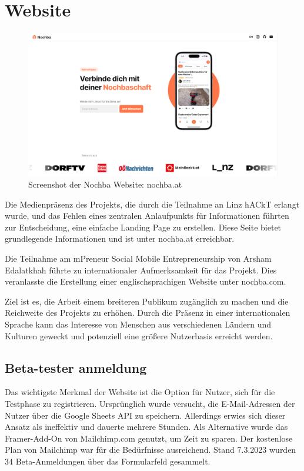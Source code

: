 \section{Website}
\begin{figure}[h]
  \includegraphics[width=1\textwidth]{pics/website-design.png}
  \caption{Screenshot der Nochba Website: nochba.at}
\end{figure}

Die Medienpräsenz des Projekts, die durch die Teilnahme an
Linz hACkT erlangt wurde, und das Fehlen eines zentralen
Anlaufpunkts für Informationen führten zur Entscheidung,
eine einfache Landing Page zu erstellen.
Diese Seite bietet grundlegende Informationen und ist unter nochba.at\cite{nochba_at} erreichbar.

Die Teilnahme am mPreneur Social Mobile Entrepreneurship von Arsham Edalatkhah führte zu internationaler Aufmerksamkeit für das Projekt. Dies veranlasste die Erstellung einer englischsprachigen Website unter nochba.com\cite{nochba_com}.



Ziel ist es, die Arbeit einem breiteren Publikum zugänglich zu machen und die Reichweite des Projekts zu erhöhen. Durch die Präsenz in einer internationalen Sprache kann das Interesse von Menschen aus verschiedenen Ländern und Kulturen geweckt und potenziell eine größere Nutzerbasis erreicht werden.


\subsection{Beta-tester anmeldung}
Das wichtigste Merkmal der Website ist die Option für Nutzer, sich für die Testphase zu registrieren. Ursprünglich wurde versucht, die E-Mail-Adressen der Nutzer über die Google Sheets API zu speichern. Allerdings erwies sich dieser Ansatz als ineffektiv und dauerte mehrere Stunden. Als Alternative wurde das Framer-Add-On von Mailchimp.com genutzt, um Zeit zu sparen. Der kostenlose Plan von Mailchimp war für die Bedürfnisse ausreichend. Stand 7.3.2023 wurden 34 Beta-Anmeldungen über das Formularfeld gesammelt.


